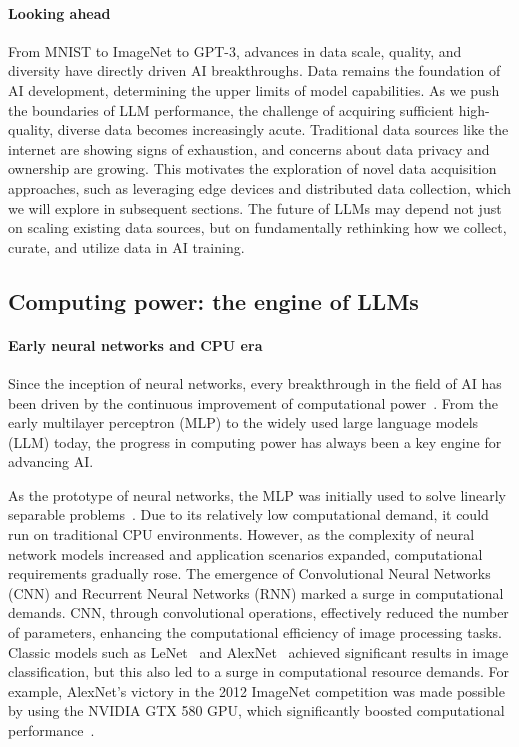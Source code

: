 \paragraph{Looking ahead}
From MNIST to ImageNet to GPT-3, advances in data scale, quality, and diversity have directly driven AI breakthroughs. Data remains the foundation of AI development, determining the upper limits of model capabilities. As we push the boundaries of LLM performance, the challenge of acquiring sufficient high-quality, diverse data becomes increasingly acute. Traditional data sources like the internet are showing signs of exhaustion, and concerns about data privacy and ownership are growing. This motivates the exploration of novel data acquisition approaches, such as leveraging edge devices and distributed data collection, which we will explore in subsequent sections. The future of LLMs may depend not just on scaling existing data sources, but on fundamentally rethinking how we collect, curate, and utilize data in AI training.


\subsection{Computing power: the engine of LLMs}

\paragraph{Early neural networks and CPU era}
Since the inception of neural networks, every breakthrough in the field of AI has been driven by the continuous improvement of computational power~\cite{thompson2020computational}. From the early multilayer perceptron (MLP) to the widely used large language models (LLM) today, the progress in computing power has always been a key engine for advancing AI.

As the prototype of neural networks, the MLP was initially used to solve linearly separable problems~\cite{rosenblatt1958perceptron}. Due to its relatively low computational demand, it could run on traditional CPU environments. However, as the complexity of neural network models increased and application scenarios expanded, computational requirements gradually rose. The emergence of Convolutional Neural Networks (CNN) and Recurrent Neural Networks (RNN) marked a surge in computational demands. CNN, through convolutional operations, effectively reduced the number of parameters, enhancing the computational efficiency of image processing tasks. Classic models such as LeNet~\cite{lecun1998gradient} and AlexNet~\cite{krizhevsky2012imagenet} achieved significant results in image classification, but this also led to a surge in computational resource demands. For example, AlexNet's victory in the 2012 ImageNet competition was made possible by using the NVIDIA GTX 580 GPU, which significantly boosted computational performance~\cite{krizhevsky2012imagenet}.

